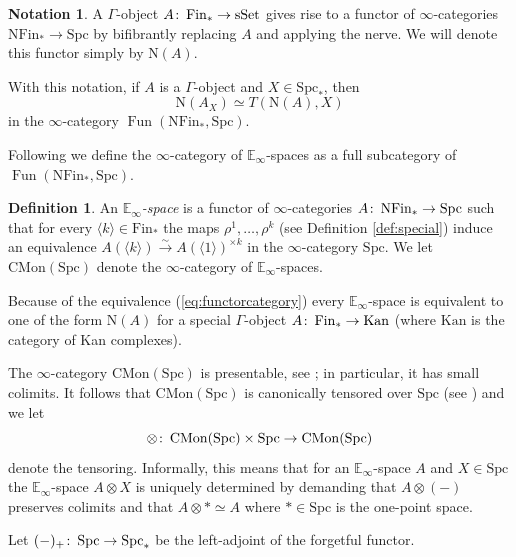 \documentclass[oneside, a4paper, 12pt]{article}
\numberwithin{equation}{section}
\DeclareMathOperator{\Fun}{Fun}
\newcommand{\CMon}{\mathrm{CMon}}
\newcommand{\Spc}{\mathrm{Spc}}
\newcommand{\Fin}{\mathrm{Fin}}
\newcommand{\sset}{\mathrm{sSet}}
\newcommand{\co}{\colon\thinspace}
\theoremstyle{plain}
\theoremstyle{definition}
\newtheorem{definition}[theorem]{Definition}
\newtheorem{notation}[theorem]{Notation}
\theoremstyle{remark}
\begin{document}
\begin{notation}
A $\Gamma$-object $A\co \Fin_\ast\to \sset$ gives rise to a functor of $\infty$-categories $\mathrm{N} \Fin_\ast \to \Spc$ by bifibrantly replacing $A$ and applying the nerve. We will denote this functor simply by $\mathrm{N}(A)$.
\end{notation}

With this notation, if $A$ is a $\Gamma$-object and $X\in \Spc_\ast$, then
\[
\mathrm{N}(A_X) \simeq T(\mathrm{N}(A),X)
\]
in the $\infty$-category $\Fun(\mathrm{N}\Fin_\ast,\Spc)$.

Following \cite[Definition 2.4.2.1]{HA} we define the $\infty$-category of $\mathbb{E}_\infty$-spaces as a full subcategory of $\Fun(\mathrm{N} \Fin_\ast,\Spc)$.

\begin{definition} \label{def:cmon}
An \emph{$\mathbb{E}_\infty$-space} is a functor of $\infty$-categories $A\co \mathrm{N} \Fin_\ast\to \Spc$ such that for every $\langle k\rangle \in \Fin_\ast$ the maps $\rho^1,\dots,\rho^k$ (see Definition \ref{def:special}) induce an equivalence $A(\langle k\rangle)\xrightarrow{\sim} A(\langle 1\rangle)^{\times k}$ in the $\infty$-category $\Spc$. We let $\CMon(\Spc)$ denote the $\infty$-category of $\mathbb{E}_\infty$-spaces.
\end{definition}


Because of the equivalence (\ref{eq:functorcategory}) every $\mathbb{E}_\infty$-space is equivalent to one of the form $\mathrm{N}(A)$ for a special $\Gamma$-object $A\co \Fin_\ast\to \mathrm{Kan}$ (where $\mathrm{Kan}$ is the category of Kan complexes).



The $\infty$-category $\CMon(\Spc)$ is presentable, see \cite[3.2.3.5]{HA}; in particular, it has small colimits. It follows that $\CMon(\Spc)$ is canonically tensored over $\Spc$ (see \cite[5.5.1.7]{HTT}) and we let
\[
\otimes \co \CMon(\Spc)\times \Spc\to \CMon(\Spc)
\]
denote the tensoring. Informally, this means that for an $\mathbb{E}_\infty$-space $A$ and $X\in \Spc$ the $\mathbb{E}_\infty$-space $A\otimes X$ is uniquely determined by demanding that $A\otimes (-)$ preserves colimits and that $A\otimes \ast\simeq A$ where $\ast\in \Spc$ is the one-point space.

Let $(-)_+\co \Spc\to \Spc_\ast$ be the left-adjoint of the forgetful functor.
\end{document}
